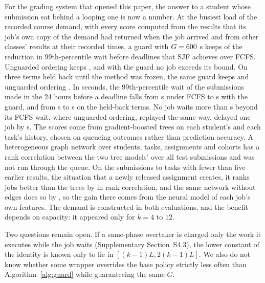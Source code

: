 For the grading system that opened this paper, the answer to a student whose submission sat
behind a looping one is now a number. At the busiest load of the recorded course demand,
with every score computed from the results that its job's own copy of the demand had
returned when the job arrived and from other classes' results at their recorded times, a guard with
$G = 600$ s keeps  of the reduction in 99th-percentile wait before
deadlines that SJF achieves over FCFS. Unguarded ordering keeps , and with the
guard no job exceeds its bound. On three terms held back until the method was frozen, the
same guard keeps  and unguarded ordering . In seconds,
the 99th-percentile wait of the submissions made in the 24 hours before a deadline falls
from  s under FCFS to  s with the guard, and from
 s to  s on the held-back terms. No job waits more than
 s beyond its FCFS wait, where unguarded ordering, replayed the same way, delayed one job by
 s. The scores come from gradient-boosted trees on each
student's and each task's history, chosen on queueing outcomes rather than prediction
accuracy. A heterogeneous graph network over students, tasks, assignments and cohorts
has a rank correlation between the two tree models' over all  test submissions and was not
run through the queue. On the  submissions to tasks with fewer than five
earlier results, the situation that a newly released assignment creates, it ranks jobs
better than the trees by  in rank correlation, and the same network without
edges does so by , so the gain there comes from the neural model of each
job's own features. The demand is constructed in both evaluations, and the benefit depends
on capacity: it appeared only for $k = 4$ to $12$.

Two questions remain open. If a same-phase overtaker is charged only the work it
executes while the job waits (Supplementary Section~S4.3), the lower constant of the
identity is known only to lie in $[(k-1)L, 2(k-1)L]$. We also do not know whether some wrapper overrides the base policy
strictly less often than Algorithm~\ref{alg:guard} while guaranteeing the same $G$.
